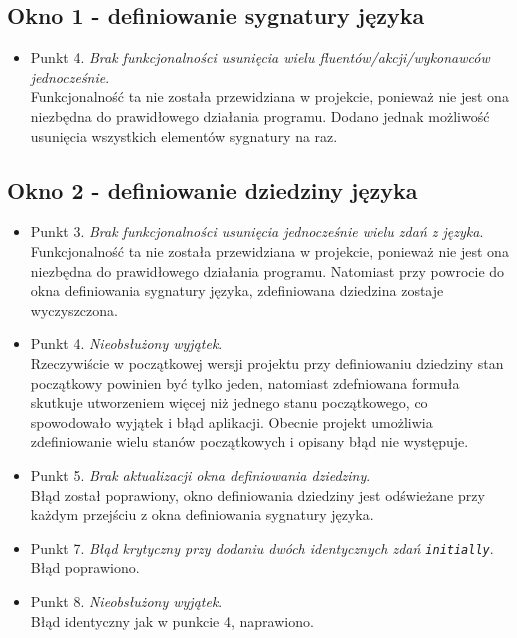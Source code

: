 \documentclass{article}
\begin{document}
\subsection{Okno 1 - definiowanie sygnatury języka}
\begin{itemize}
        \item Punkt 4. \textit{Brak funkcjonalności usunięcia wielu  fluentów/akcji/wykonawców jednocześnie}.\\
        Funkcjonalność ta nie została przewidziana w projekcie, ponieważ nie jest ona niezbędna do prawidłowego działania programu. Dodano jednak możliwość usunięcia wszystkich elementów sygnatury na raz.
    \end{itemize}
    
\subsection{Okno 2 - definiowanie dziedziny języka}
\begin{itemize}
        \item Punkt 3. \textit{Brak funkcjonalności usunięcia jednocześnie wielu zdań z języka}.\\
        Funkcjonalność ta nie została przewidziana w projekcie, ponieważ nie jest ona niezbędna do prawidłowego działania programu. Natomiast przy powrocie do okna definiowania sygnatury języka, zdefiniowana dziedzina zostaje wyczyszczona.
        \item Punkt 4. \textit{Nieobsłużony wyjątek}.\\
        Rzeczywiście w początkowej wersji projektu przy definiowaniu dziedziny stan początkowy powinien być tylko jeden, natomiast zdefniowana formuła skutkuje utworzeniem więcej niż jednego stanu początkowego, co spowodowało wyjątek i błąd aplikacji. Obecnie projekt umożliwia zdefiniowanie wielu stanów początkowych i opisany błąd nie występuje. 
        \item Punkt 5. \textit{Brak aktualizacji okna definiowania dziedziny}.\\
        Błąd został poprawiony, okno definiowania dziedziny jest odświeżane przy każdym przejściu z okna definiowania sygnatury języka.
        \item Punkt 7. \textit{Błąd krytyczny przy dodaniu dwóch identycznych zdań \texttt{initially}}.\\
        Błąd poprawiono.
        \item Punkt 8. \textit{Nieobsłużony wyjątek}.\\
        Błąd identyczny jak w punkcie 4, naprawiono.
    \end{itemize}
\newpage
\end{document}
